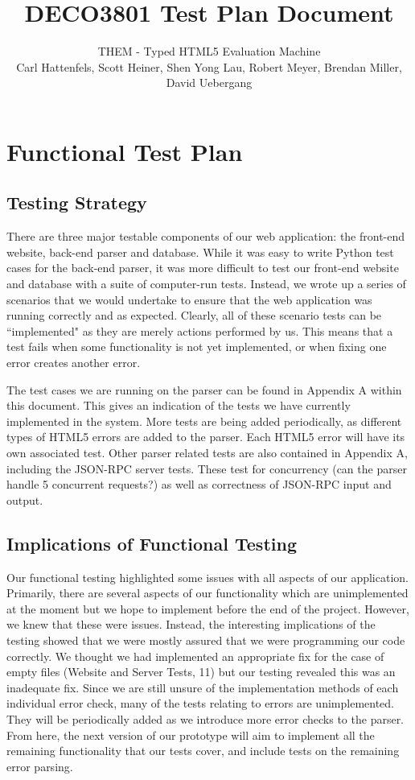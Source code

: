\documentclass[10pt]{article}
\title{\bf DECO3801 Test Plan Document}
\author{\normalsize THEM - Typed HTML5 Evaluation Machine \\ \normalsize Carl Hattenfels, Scott Heiner, Shen Yong Lau, Robert Meyer, Brendan Miller, David Uebergang}
\date{}
\begin{document}
\maketitle

\section*{Functional Test Plan}

\subsection*{Testing Strategy}

There are three major testable components of our web application: the front-end website, back-end parser and database. While it was easy to write Python test cases for the back-end parser, it was more difficult to test our front-end website and database with a suite of computer-run tests. Instead, we wrote up a series of scenarios that we would undertake to ensure that the web application was running correctly and as expected. Clearly, all of these scenario tests can be ``implemented" as they are merely actions performed by us. This means that a test fails when some functionality is not yet implemented, or when fixing one error creates another error.

The test cases we are running on the parser can be found in Appendix A within this document. This gives an indication of the tests we have currently implemented in the system. More tests are being added periodically, as different types of HTML5 errors are added to the parser. Each HTML5 error will have its own associated test. Other parser related tests are also contained in Appendix A, including the JSON-RPC server tests. These test for concurrency (can the parser handle 5 concurrent requests?) as well as correctness of JSON-RPC input and output.

\subsection*{Implications of Functional Testing}

Our functional testing highlighted some issues with all aspects of our application. Primarily, there are several aspects of our functionality which are unimplemented at the moment but we hope to implement before the end of the project. However, we knew that these were issues. Instead, the interesting implications of the testing showed that we were mostly assured that we were programming our code correctly. We thought we had implemented an appropriate fix for the case of empty files (Website and Server Tests, 11) but our testing revealed this was an inadequate fix. Since we are still unsure of the implementation methods of each individual error check, many of the tests relating to errors are unimplemented. They will be periodically added as we introduce more error checks to the parser. From here, the next version of our prototype will aim to implement all the remaining functionality that our tests cover, and include tests on the remaining error parsing.
\end{document}

